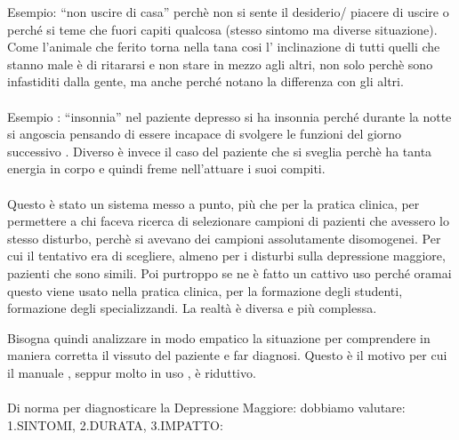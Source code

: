 Esempio: ``non uscire di casa'' perchè non si sente il desiderio/
piacere di uscire o perché si teme che fuori capiti qualcosa (stesso
sintomo ma diverse situazione). Come l'animale che ferito torna nella
tana cosi l' inclinazione di tutti quelli che stanno male è di ritararsi
e non stare in mezzo agli altri, non solo perchè sono infastiditi dalla
gente, ma anche perché notano la differenza con gli altri.
\\\\
Esempio : ``insonnia'' nel paziente depresso si ha insonnia perché
durante la notte si angoscia pensando di essere incapace di svolgere le
funzioni del giorno successivo . Diverso è invece il caso del paziente
che si sveglia perchè ha tanta energia in corpo e quindi freme
nell'attuare i suoi compiti.
\\\\
Questo è stato un sistema messo a punto, più che per la pratica clinica,
per permettere a chi faceva ricerca di selezionare campioni di pazienti
che avessero lo stesso disturbo, perchè si avevano dei campioni
assolutamente disomogenei. Per cui il tentativo era di scegliere, almeno
per i disturbi sulla depressione maggiore, pazienti che sono simili. Poi
purtroppo se ne è fatto un cattivo uso perché oramai questo viene usato
nella pratica clinica, per la formazione degli studenti, formazione
degli specializzandi. La realtà è diversa e più complessa.

Bisogna quindi analizzare in modo empatico la situazione per comprendere
in maniera corretta il vissuto del paziente e far diagnosi. Questo è il
motivo per cui il manuale , seppur molto in uso , è riduttivo.
\\\\
Di norma per diagnosticare la Depressione Maggiore: dobbiamo valutare:
1.SINTOMI, 2.DURATA, 3.IMPATTO:

